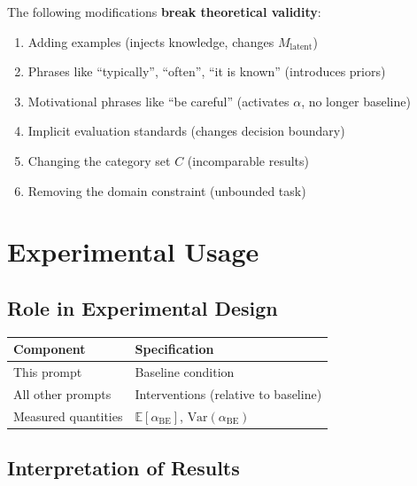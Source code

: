 \documentclass[11pt,a4paper]{article}
\begin{document}
\begin{warningbox}
The following modifications \textbf{break theoretical validity}:

\begin{enumerate}
    \item[$\times$] Adding examples (injects knowledge, changes $M_{\text{latent}}$)
    \item[$\times$] Phrases like ``typically'', ``often'', ``it is known'' (introduces priors)
    \item[$\times$] Motivational phrases like ``be careful'' (activates $\alpha$, no longer baseline)
    \item[$\times$] Implicit evaluation standards (changes decision boundary)
    \item[$\times$] Changing the category set $C$ (incomparable results)
    \item[$\times$] Removing the domain constraint (unbounded task)
\end{enumerate}
\end{warningbox}


\section{Experimental Usage}

\subsection{Role in Experimental Design}

\begin{table}[h]
\centering
\begin{tabular}{ll}
\toprule
\textbf{Component} & \textbf{Specification} \\
\midrule
This prompt & Baseline condition \\
All other prompts & Interventions (relative to baseline) \\
Measured quantities & $\mathbb{E}[\alpha_{\text{BE}}]$, $\text{Var}(\alpha_{\text{BE}})$ \\
\bottomrule
\end{tabular}
\end{table}

\subsection{Interpretation of Results}
\end{document}
